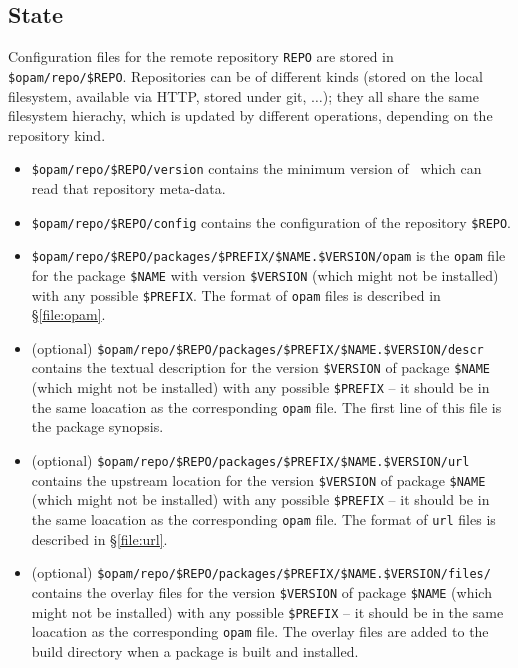 \documentclass[a4paper,10pt]{article}
\begin{document}
\subsection{State}
\label{state-repo}

Configuration files for the remote repository \verb+REPO+ are stored in
\verb+$opam/repo/$REPO+. Repositories can be of different kinds
(stored on the local filesystem, available via HTTP, stored under git,
$\ldots$); they all share the same filesystem hierachy, which is
updated by different operations, depending on the repository kind.

\begin{itemize}

\item \verb+$opam/repo/$REPO/version+ contains the minimum version of
  \OPAM\ which can read that repository meta-data.

\item \verb+$opam/repo/$REPO/config+ contains the configuration
  of the repository \verb+$REPO+.

\item \verb+$opam/repo/$REPO/packages/$PREFIX/$NAME.$VERSION/opam+ is
  the {\tt opam} file for the package \verb+$NAME+ with version
  \verb+$VERSION+ (which might not be installed) with any possible
  \verb+$PREFIX+. The format of {\tt opam} files is described in
  \S\ref{file:opam}.

\item (optional) \verb+$opam/repo/$REPO/packages/$PREFIX/$NAME.$VERSION/descr+
  contains the textual description for the version \verb+$VERSION+ of
  package \verb+$NAME+ (which might not be installed) with any
  possible \verb+$PREFIX+ -- it should be in the same loacation as the
  corresponding {\tt opam} file. The first line of this file is the
  package synopsis.

\item (optional) \verb+$opam/repo/$REPO/packages/$PREFIX/$NAME.$VERSION/url+
  contains the upstream location for the version \verb+$VERSION+ of
  package \verb+$NAME+ (which might not be installed) with any
  possible \verb+$PREFIX+ -- it should be in the same loacation as the
  corresponding {\tt opam} file. The format of {\tt url} files is
  described in \S\ref{file:url}.

\item (optional) \verb+$opam/repo/$REPO/packages/$PREFIX/$NAME.$VERSION/files/+
  contains the overlay files for the version \verb+$VERSION+ of
  package \verb+$NAME+ (which might not be installed) with any
  possible \verb+$PREFIX+ -- it should be in the same loacation as the
  corresponding {\tt opam} file. The overlay files are added to the
  build directory when a package is built and installed.


\end{itemize}
\end{document}
